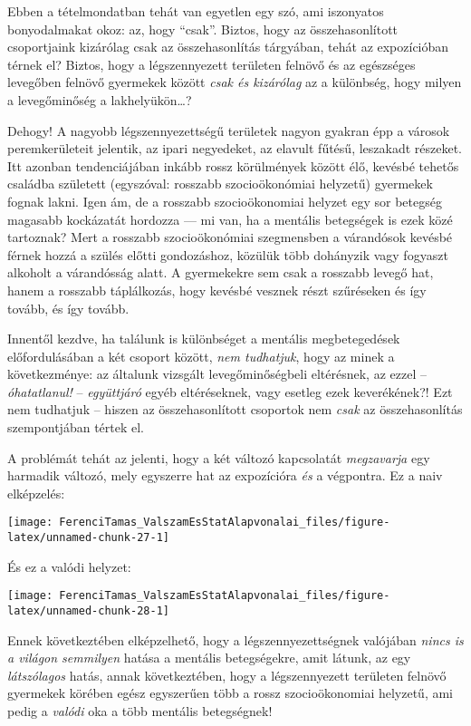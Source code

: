 \documentclass[magyar,]{book}
\begin{document}
Ebben a tételmondatban tehát van egyetlen egy szó, ami iszonyatos bonyodalmakat okoz: az, hogy \enquote{csak}. Biztos, hogy az összehasonlított csoportjaink kizárólag csak az összehasonlítás tárgyában, tehát az expozícióban térnek el? Biztos, hogy a légszennyezett területen felnövő és az egészséges levegőben felnövő gyermekek között \emph{csak és kizárólag} az a különbség, hogy milyen a levegőminőség a lakhelyükön\ldots?

Dehogy! A nagyobb légszennyezettségű területek nagyon gyakran épp a városok peremkerületeit jelentik, az ipari negyedeket, az elavult fűtésű, leszakadt részeket. Itt azonban tendenciájában inkább rossz körülmények között élő, kevésbé tehetős családba született (egyszóval: rosszabb szocioökonómiai helyzetű) gyermekek fognak lakni. Igen ám, de a rosszabb szocioökonomiai helyzet egy sor betegség magasabb kockázatát hordozza --- mi van, ha a mentális betegségek is ezek közé tartoznak? Mert a rosszabb szocioökonómiai szegmensben a várandósok kevésbé férnek hozzá a szülés előtti gondozáshoz, közülük több dohányzik vagy fogyaszt alkoholt a várandósság alatt. A gyermekekre sem csak a rosszabb levegő hat, hanem a rosszabb táplálkozás, hogy kevésbé vesznek részt szűréseken és így tovább, és így tovább.

Innentől kezdve, ha találunk is különbséget a mentális megbetegedések előfordulásában a két csoport között, \emph{nem tudhatjuk}, hogy az minek a következménye: az általunk vizsgált levegőminőségbeli eltérésnek, az ezzel -- \emph{óhatatlanul!} -- \emph{együttjáró} egyéb eltéréseknek, vagy esetleg ezek keverékének?! Ezt nem tudhatjuk -- hiszen az összehasonlított csoportok nem \emph{csak} az összehasonlítás szempontjában tértek el.

A problémát tehát az jelenti, hogy a két változó kapcsolatát \emph{megzavarja} egy harmadik változó, mely egyszerre hat az expozícióra \emph{és} a végpontra. Ez a naiv elképzelés:

\begin{center}\texttt{[image: FerenciTamas\_ValszamEsStatAlapvonalai\_files/figure-latex/unnamed-chunk-27-1]} \end{center}

És ez a valódi helyzet:

\begin{center}\texttt{[image: FerenciTamas\_ValszamEsStatAlapvonalai\_files/figure-latex/unnamed-chunk-28-1]} \end{center}

Ennek következtében elképzelhető, hogy a légszennyezettségnek valójában \emph{nincs is a világon semmilyen} hatása a mentális betegségekre, amit látunk, az egy \emph{látszólagos} hatás, annak következtében, hogy a légszennyezett területen felnövő gyermekek körében egész egyszerűen több a rossz szocioökonomiai helyzetű, ami pedig a \emph{valódi} oka a több mentális betegségnek!
\end{document}
